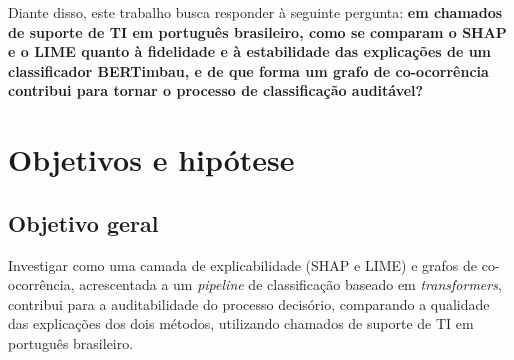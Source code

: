 \documentclass[
    12pt,                %
    openright,           %
    oneside,             %
    a4paper,             %
    english,             %
    brazil               %
]{abntex2}
\begin{document}
Diante disso, este trabalho busca responder à seguinte pergunta: 
\textbf{em chamados de suporte de TI em português brasileiro, como se comparam o 
SHAP e o LIME quanto à fidelidade e à estabilidade das explicações de um 
classificador BERTimbau, e de que forma um grafo de co-ocorrência contribui para 
tornar o processo de classificação auditável?}

\section{Objetivos e hipótese}

\subsection{Objetivo geral}
Investigar como uma camada de explicabilidade (SHAP e LIME) 
e grafos de co-ocorrência, acrescentada a um \textit{pipeline} 
de classificação baseado em \textit{transformers}, contribui 
para a auditabilidade do processo decisório, comparando a 
qualidade das explicações dos dois métodos, utilizando chamados 
de suporte de TI em português brasileiro.
\end{document}

